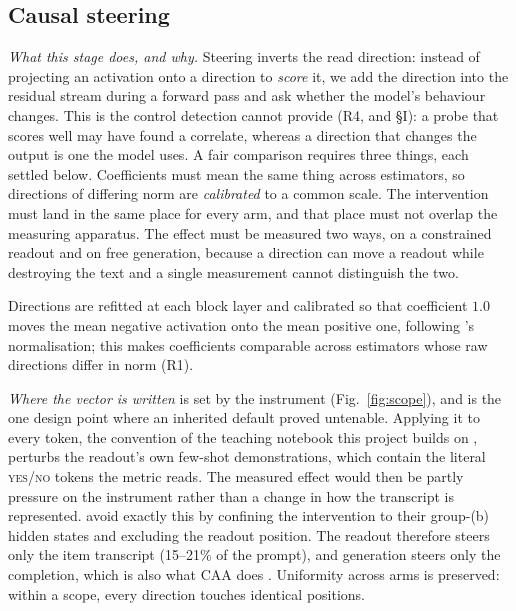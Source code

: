 \documentclass[conference]{IEEEtran}
\begin{document}
\subsection{Causal steering}
\label{sec:steering}

\emph{What this stage does, and why.} Steering inverts the read direction: instead
of projecting an activation onto a direction to \emph{score} it, we add the
direction into the residual stream during a forward pass and ask whether the model's
behaviour changes. This is the control detection cannot provide (R4, and §I): a probe
that scores well may have found a correlate, whereas a direction that changes the
output is one the model uses. A fair comparison requires three things, each settled
below. Coefficients must mean the same thing across estimators, so directions of
differing norm are \emph{calibrated} to a common scale. The intervention must land in
the same place for every arm, and that place must not overlap the measuring
apparatus. The effect must be measured two ways, on a constrained readout and on free
generation, because a direction can move a readout while destroying the text and a
single measurement cannot distinguish the two.

Directions are refitted at each block layer and calibrated so that coefficient
$1.0$ moves the mean negative activation onto the mean positive one, following
\citeauthor{marks2024}'s normalisation; this makes coefficients comparable across
estimators whose raw directions differ in norm (R1).

\emph{Where the vector is written} is set by the instrument
(Fig.~\ref{fig:scope}), and is the one design point where an inherited default
proved untenable. Applying it to every token, the convention of the teaching notebook this
project builds on \citep{arena2024}, perturbs the readout's own few-shot
demonstrations, which contain the literal \textsc{yes}/\textsc{no} tokens the metric
reads. The measured effect would then be partly pressure on the instrument rather
than a change in how the transcript is represented.
\citet{marks2024} avoid exactly this by confining the intervention to their
group-(b) hidden states and excluding the readout position. The readout therefore
steers only the item transcript (15--21\% of the prompt), and generation steers
only the completion, which is also what CAA does \citep{rimsky2024}. Uniformity
across arms is preserved: within a scope, every direction touches identical
positions.
\end{document}
